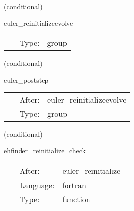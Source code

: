    (conditional) 

\hspace{5mm} euler\_reinitializeevolve 

\hspace{5mm}{\it schedule group for euler re-initialization evolution with pugh } 


\hspace{5mm}

 \begin{tabular*}{160mm}{cll} 
~ & Type:  & group \\ 
\end{tabular*} 


\vspace{5mm}

   (conditional) 

\hspace{5mm} euler\_poststep 

\hspace{5mm}{\it schedule group for euler re-initialization post step } 


\hspace{5mm}

 \begin{tabular*}{160mm}{cll} 
~ & After:  & euler\_reinitializeevolve \\ 
~ & Type:  & group \\ 
\end{tabular*} 


\vspace{5mm}

   (conditional) 

\hspace{5mm} ehfinder\_reinitialize\_check 

\hspace{5mm}{\it check to see if re-initialization has to be undone } 


\hspace{5mm}

 \begin{tabular*}{160mm}{cll} 
~ & After:  & euler\_reinitialize \\ 
~ & Language:  & fortran \\ 
~ & Type:  & function \\ 
\end{tabular*} 


\vspace{5mm}


